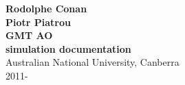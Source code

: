 \documentclass[10pt]{article}
\numberwithin{equation}{subsection}
\begin{document}
\begin{center}
    \vspace{5cm}
    \LARGE{\textbf{Rodolphe Conan \\ Piotr Piatrou}} \\
    \vspace{5cm}
    \Huge{\textbf{GMT AO \\ simulation documentation}} \\
    \vspace{13cm}
    \Large{Australian National University, Canberra \\ 2011-}
\end{center}

\newpage
\tableofcontents











\newpage
\printindex %
\end{document}
